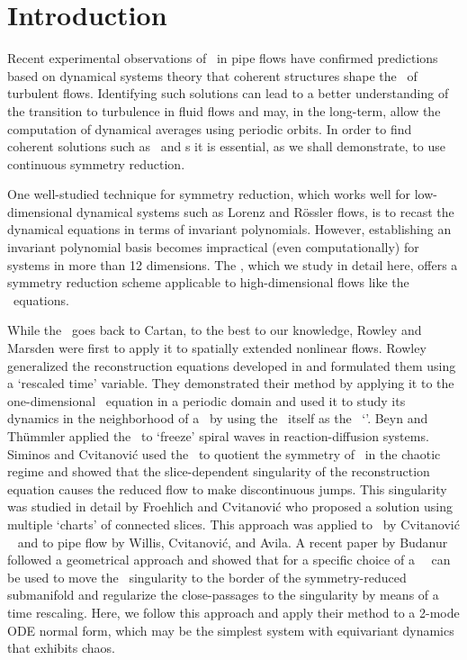 \section{Introduction}
\label{s:intro}

Recent experimental observations of \reqva\ in pipe flows have confirmed
predictions based on dynamical systems theory that coherent structures shape 
the \statesp\ of turbulent flows. Identifying such solutions can lead to a better
understanding of the transition to turbulence in fluid flows and may, in the long-term,
allow the computation of dynamical averages using periodic orbits. In order to
find coherent solutions such as \reqva\ and \rpo s it is essential, as we shall demonstrate, 
to use continuous symmetry reduction.

One well-studied technique for symmetry reduction, which works well for low-dimensional dynamical systems such 
as Lorenz and R\"{o}ssler flows, is to recast the dynamical equations in terms of invariant polynomials. However, establishing an invariant polynomial basis becomes impractical (even computationally) for systems in more than 12 dimensions.
The \mslices%
,
which we study in detail here, offers a symmetry reduction
scheme applicable to high-dimensional flows like the \NS\ equations.

While the \mslices\ goes back to Cartan, to the
best to our knowledge, Rowley and Marsden
were first to apply it to spatially extended nonlinear flows. Rowley
\etal~ generalized the reconstruction equations
developed in  and formulated them using a `rescaled
time' variable. They demonstrated their method by applying it to the one-dimensional \KS\ equation
in a periodic domain and used it to study its dynamics in the neighborhood of a \reqv\ by using the \reqv\ itself as the \slice\ `\template'.  Beyn and
Th\"{u}mmler applied the \mslices\ to `freeze' spiral
waves in reaction-diffusion systems.
Siminos and Cvitanovi\'{c} used the \mslices\ to quotient the  symmetry of
\cLf\ in the chaotic regime and showed that the slice-dependent
singularity of the reconstruction equation causes the reduced flow to make
discontinuous jumps. This singularity was studied in detail by 
Froehlich and Cvitanovi\'{c} who proposed a solution using multiple `charts' of connected
slices. This approach was applied to \cLf\
by Cvitanovi\'{c} \etal~ and to pipe flow by Willis, Cvitanovi\'{c}, and Avila. A
recent paper by Budanur \etal\rf{BudCvi14} followed a geometrical approach
and showed that for \SOn{2} a specific choice of a \slice\
\template\ can be used to move the \slice\ singularity to the border of the
symmetry-reduced submanifold and regularize the close-passages to the
singularity by means of a time rescaling. Here, we follow this approach
and apply their method to a 2-mode ODE normal form, which may be
the simplest system with \SOn{2} equivariant dynamics
that exhibits chaos.

